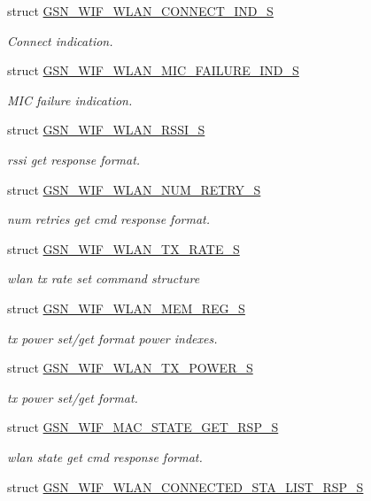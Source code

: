 \begin{DoxyCompactItemize}
struct \hyperlink{a00373}{GSN\_\-WIF\_\-WLAN\_\-CONNECT\_\-IND\_\-S}
\begin{DoxyCompactList}\small\item\em Connect indication. \end{DoxyCompactList}\item 
struct \hyperlink{a00391}{GSN\_\-WIF\_\-WLAN\_\-MIC\_\-FAILURE\_\-IND\_\-S}
\begin{DoxyCompactList}\small\item\em MIC failure indication. \end{DoxyCompactList}\item 
struct \hyperlink{a00395}{GSN\_\-WIF\_\-WLAN\_\-RSSI\_\-S}
\begin{DoxyCompactList}\small\item\em rssi get response format. \end{DoxyCompactList}\item 
struct \hyperlink{a00392}{GSN\_\-WIF\_\-WLAN\_\-NUM\_\-RETRY\_\-S}
\begin{DoxyCompactList}\small\item\em num retries get cmd response format. \end{DoxyCompactList}\item 
struct \hyperlink{a00409}{GSN\_\-WIF\_\-WLAN\_\-TX\_\-RATE\_\-S}
\begin{DoxyCompactList}\small\item\em wlan tx rate set command structure \end{DoxyCompactList}\item 
struct \hyperlink{a00390}{GSN\_\-WIF\_\-WLAN\_\-MEM\_\-REG\_\-S}
\begin{DoxyCompactList}\small\item\em tx power set/get format power indexes. \end{DoxyCompactList}\item 
struct \hyperlink{a00408}{GSN\_\-WIF\_\-WLAN\_\-TX\_\-POWER\_\-S}
\begin{DoxyCompactList}\small\item\em tx power set/get format. \end{DoxyCompactList}\item 
struct \hyperlink{a00341}{GSN\_\-WIF\_\-MAC\_\-STATE\_\-GET\_\-RSP\_\-S}
\begin{DoxyCompactList}\small\item\em wlan state get cmd response format. \end{DoxyCompactList}\item 
struct \hyperlink{a00375}{GSN\_\-WIF\_\-WLAN\_\-CONNECTED\_\-STA\_\-LIST\_\-RSP\_\-S}

\end{DoxyCompactItemize}
